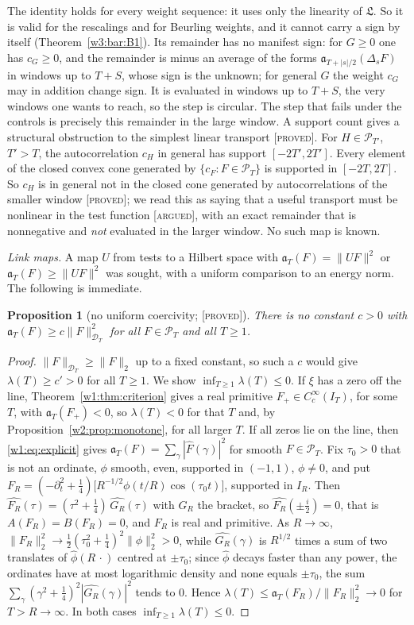 \documentclass[11pt]{amsart}
\newtheorem{proposition}[theorem]{Proposition}
\theoremstyle{definition}
\theoremstyle{remark}
\numberwithin{equation}{section}
\newcommand{\IT}{I_T}                                  %
\newcommand{\Fh}{\widehat F}                           %
\newcommand{\cF}{c_F}                                  %
\newcommand{\PT}{\mathcal{P}_T}                        %
\newcommand{\DT}{\mathcal{D}_T}                        %
\newcommand{\aT}{\mathfrak{a}_T}                       %
\newcommand{\lam}{\lambda(T)}                          %
\newcommand{\stag}[1]{\textsc{[#1]}}
\newcommand{\PROVED}{\stag{proved}}
\newcommand{\ARGUED}{\stag{argued}}
\begin{document}
The identity holds for every weight sequence: it uses only the linearity of $\mathfrak L$. So it is valid for the
rescalings and for Beurling weights, and it cannot carry a sign by itself (Theorem~\ref{w3:bar:B1}). Its remainder
has no manifest sign: for $G\ge0$ one has $c_G\ge0$, and the remainder is minus an average of the forms $\mathfrak a_{T+|s|/2}(\Delta_sF)$ in windows up to $T+S$, whose sign is the unknown; for general $G$ the weight $c_G$ may in addition change sign. It is evaluated in windows up to $T+S$, the very windows one wants to
reach, so the step is circular. The step that fails under the controls is precisely this remainder in the large
window. A support count gives a structural obstruction to the simplest linear transport \PROVED. For $H\in\mathcal P_{T'}$,
$T'>T$, the autocorrelation $c_H$ in general has support $[-2T',2T']$. Every element of the closed convex cone
generated by $\{\cF:F\in\PT\}$ is supported in $[-2T,2T]$. So $c_H$ is in general not in the closed cone generated by autocorrelations of the smaller window \PROVED; we
read this as saying that a useful transport must be nonlinear in the test function \ARGUED, with an exact remainder that is nonnegative and \emph{not} evaluated in the larger window. No
such map is known.

\emph{Link maps.} A map $U$ from tests to a Hilbert space with $\aT(F)=\|UF\|^2$ or $\aT(F)\ge\|UF\|^2$ was sought,
with a uniform comparison to an energy norm. The following is immediate.

\begin{proposition}[no uniform coercivity; \PROVED]\label{w8:prop:nocoerc}
There is no constant $c>0$ with $\aT(F)\ge c\|F\|_{\DT}^2$ for all $F\in\PT$ and all $T\ge1$.
\end{proposition}

\begin{proof}
$\|F\|_{\DT}\ge\|F\|_2$ up to a fixed constant, so such a $c$ would give $\lam\ge c'>0$ for all $T\ge1$. We show
$\inf_{T\ge1}\lam\le0$. If $\xi$ has a zero off the line, Theorem~\ref{w1:thm:criterion} gives a real primitive
$F_+\in C_c^\infty(\IT)$, for some $T$, with $\aT(F_+)<0$, so $\lam<0$ for that $T$ and, by
Proposition~\ref{w2:prop:monotone}, for all larger $T$. If all zeros lie on the line, then
\eqref{w1:eq:explicit} gives $\aT(F)=\sum_\gamma|\Fh(\gamma)|^2$ for smooth $F\in\PT$. Fix $\tau_0>0$ that is not an
ordinate, $\phi$ smooth, even, supported in $(-1,1)$, $\phi\ne0$, and put
$F_R=(-\partial_t^2+\frac14)\bigl[R^{-1/2}\phi(t/R)\cos(\tau_0t)\bigr]$, supported in $I_R$. Then
$\widehat{F_R}(\tau)=(\tau^2+\frac14)\,\widehat{G_R}(\tau)$ with $G_R$ the bracket, so $\widehat{F_R}(\pm\frac i2)=0$,
that is $A(F_R)=B(F_R)=0$, and $F_R$ is real and primitive. As $R\to\infty$, $\|F_R\|_2^2\to\frac12(\tau_0^2+\frac14)^2\|\phi\|_2^2>0$,
while $\widehat{G_R}(\gamma)$ is $R^{1/2}$ times a sum of two translates of $\widehat\phi(R\,\cdot)$ centred at $\pm\tau_0$;
since $\widehat\phi$ decays faster than any power, the ordinates have at most logarithmic density and none equals
$\pm\tau_0$, the sum $\sum_\gamma(\gamma^2+\frac14)^2|\widehat{G_R}(\gamma)|^2$ tends to $0$. Hence
$\lambda(T)\le\aT(F_R)/\|F_R\|_2^2\to0$ for $T>R\to\infty$. In both cases $\inf_{T\ge1}\lam\le0$.
\end{proof}
\end{document}
